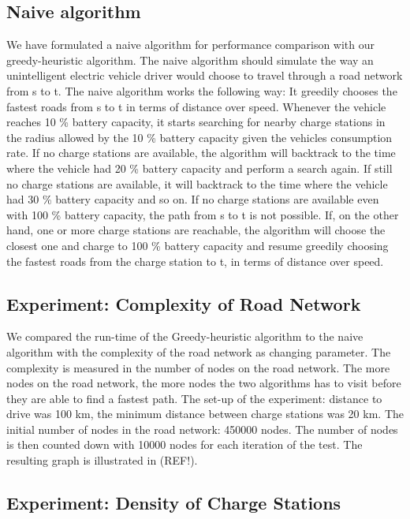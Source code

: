 \subsection{Naive algorithm}
\label{sub:naivealgorithm}
We have formulated a naive algorithm for performance comparison with our greedy-heuristic algorithm. The naive algorithm should simulate the way an unintelligent electric vehicle driver would choose to travel through a road network from s to t. The naive algorithm works the following way: It greedily chooses the fastest roads from s to t in terms of distance over speed. Whenever the vehicle reaches 10 \% battery capacity, it starts searching for nearby charge stations in the radius allowed by the 10 \% battery capacity given the vehicles consumption rate. If no charge stations are available, the algorithm will backtrack to the time where the vehicle had 20 \% battery capacity and perform a search again. If still no charge stations are available, it will backtrack to the time where the vehicle had 30 \% battery capacity and so on. If no charge stations are available even with 100 \% battery capacity, the path from s to t is not possible. If, on the other hand, one or more charge stations are reachable, the algorithm will choose the closest one and charge to 100 \% battery capacity and resume greedily choosing the fastest roads from the charge station to t, in terms of distance over speed.

\subsection{Experiment: Complexity of Road Network}

We compared the run-time of the Greedy-heuristic algorithm to the naive algorithm with the complexity of the road network as changing parameter. The
complexity is measured in the number of nodes on the road network. The more nodes on the road network, the more nodes the two algorithms has 
to visit before they are able to find a fastest path. The set-up of the experiment: distance to drive was 100 km, the minimum distance between 
charge stations was 20 km. The initial number of nodes in the road network: 450000 nodes. The number of nodes is then counted down with 10000 nodes 
for each iteration of the test. The resulting graph is illustrated in (REF!).

\subsection{Experiment: Density of Charge Stations}

